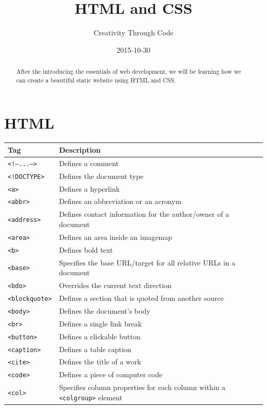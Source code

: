 \documentclass[11pt, letterpaper]{article}
\title{HTML and CSS}
\date{2015-10-30}
\author{Creativity Through Code}
\begin{document}
	\maketitle
	\newpage
	\begin{abstract}
		After the introducing the essentials of web development, we will be learning how we can create a beautiful static website using HTML and CSS.
	\end{abstract}
	\section{HTML}
		\begin{longtable}{l p{10cm} l}
			\toprule
			Tag & Description \\\midrule
			\texttt{<!---...--->} & Defines a comment \\\midrule
			\texttt{<!DOCTYPE>} & Defines the document type \\\midrule
			\texttt{<a>} & Defines a hyperlink \\\midrule
			\texttt{<abbr>} & Defines an abbreviation or an acronym \\\midrule
			\texttt{<address>} & Defines contact information for the author/owner of a document \\\midrule
			\texttt{<area>} & Defines an area inside an image­map
\\\midrule
			\texttt{<b>} & Defines bold text \\\midrule
			\texttt{<base>} & Specifies the base URL/target for all relative URLs in a document \\\midrule
			\texttt{<bdo>} & Overrides the current text direction \\\midrule
			\texttt{<blockquote>} & Defines a section that is quoted from another source \\\midrule
			\texttt{<body>} & Defines the document's body \\\midrule
			\texttt{<br>} & Defines a single link break \\\midrule
			\texttt{<button>} & Defines a clickable button \\\midrule
			\texttt{<caption>} & Defines a table caption \\\midrule
			\texttt{<cite>} & Defines the title of a work\\\midrule
			\texttt{<code>} & Defines a piece of computer code\\\midrule
			\texttt{<col>} & Specifies column properties for each column within a \texttt{<colgroup>} element\\\midrule

\end{longtable}
\end{document}
